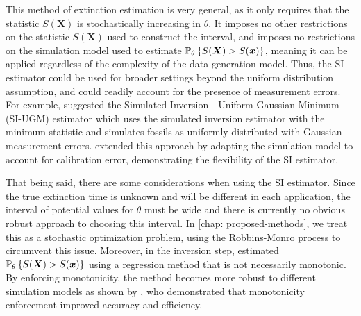 This method of extinction estimation is very general, as it only requires that the statistic $S(\bm{X})$ is stochastically increasing in $\theta$. It imposes no other restrictions on the statistic $S(\bm{X})$ used to construct the interval, and imposes no restrictions on the simulation model used to estimate $\mathbb{P}_\theta\left\{S(\bm{X}) > S(\bm{x})\right\}$, meaning it can be applied regardless of the complexity of the data generation model. Thus, the SI estimator could be used for broader settings beyond the uniform distribution assumption, and could readily account for the presence of measurement errors. For example, \citet{Huang2019} suggested the Simulated Inversion - Uniform Gaussian Minimum (SI-UGM) estimator which uses the simulated inversion estimator with the minimum statistic and simulates fossils as uniformly distributed with Gaussian measurement errors. \citet{King2020} extended this approach by adapting the simulation model to account for calibration error, demonstrating the flexibility of the SI estimator.

That being said, there are some considerations when using the SI estimator. Since the true extinction time is unknown and will be different in each application, the interval of potential values for $\theta$ must be wide and there is currently no obvious robust approach to choosing this interval. In \autoref{chap: proposed-methods}, we treat this as a stochastic optimization problem, using the Robbins-Monro process to circumvent this issue. Moreover, in the inversion step, \citet{Huang2019} estimated $\mathbb{P}_\theta\left\{S(\bm{X}) > S(\bm{x})\right\}$ using a regression method that is not necessarily monotonic. By enforcing monotonicity, the method becomes more robust to different simulation models as shown by \citet{King2020}, who demonstrated that monotonicity enforcement improved accuracy and efficiency.